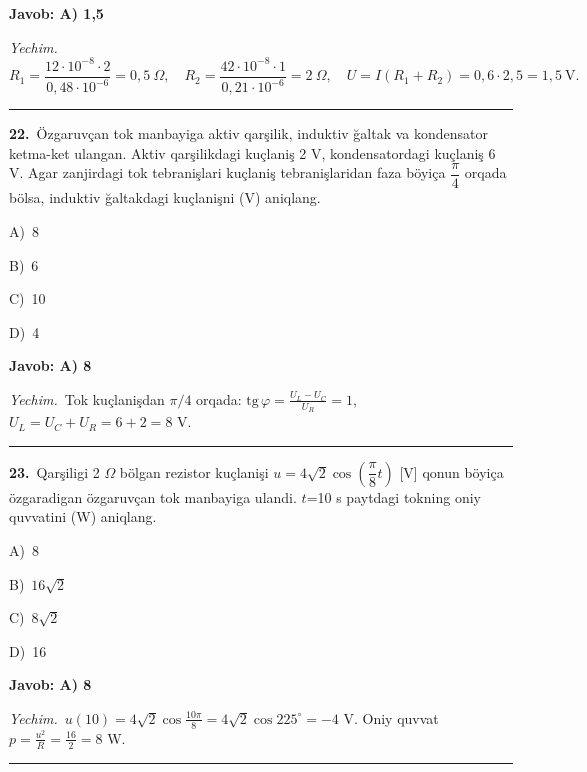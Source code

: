 \documentclass[11pt,a4paper]{article}
\newcommand{\opt}[2]{\hspace*{4mm}#1)\ #2\par}
\begin{document}
\noindent\colorbox{gray!12}{\parbox{\dimexpr\linewidth-2\fboxsep}{\textbf{Javob: A) 1,5}}}\par\smallskip
\noindent\textit{Yechim.}\ \[R_1=\frac{12\cdot10^{-8}\cdot2}{0{,}48\cdot10^{-6}}=0{,}5\ \Omega,\quad R_2=\frac{42\cdot10^{-8}\cdot1}{0{,}21\cdot10^{-6}}=2\ \Omega,\quad U=I(R_1+R_2)=0{,}6\cdot2{,}5=1{,}5\ \text{V}.\]\par\medskip\hrule\medskip
{}\noindent\begin{minipage}{\linewidth}
\textbf{22.}\ Özgaruvçan tok manbayiga aktiv qarşilik, induktiv ğaltak va kondensator ketma-ket ulangan. Aktiv qarşilikdagi kuçlaniş 2 V, kondensatordagi kuçlaniş 6 V. Agar zanjirdagi tok tebranişlari kuçlaniş tebranişlaridan faza böyiça $\dfrac{\pi}{4}$ orqada bölsa, induktiv ğaltakdagi kuçlanişni (V) aniqlang.\par\smallskip
\opt{A}{8}
\opt{B}{6}
\opt{C}{10}
\opt{D}{4}
\end{minipage}\vspace{2pt}\par
\noindent\colorbox{gray!12}{\parbox{\dimexpr\linewidth-2\fboxsep}{\textbf{Javob: A) 8}}}\par\smallskip
\noindent\textit{Yechim.}\ Tok kuçlanişdan $\pi/4$ orqada: $\mathrm{tg}\,\varphi=\frac{U_L-U_C}{U_R}=1$, $U_L=U_C+U_R=6+2=8$ V.\par\par\medskip\hrule\medskip
{}\noindent\begin{minipage}{\linewidth}
\textbf{23.}\ Qarşiligi 2 $\Omega$ bölgan rezistor kuçlanişi $u = 4\sqrt{2}\cos(\dfrac{\pi}{8}t)$ [V] qonun böyiça özgaradigan özgaruvçan tok manbayiga ulandi. $t$=10 s paytdagi tokning oniy quvvatini (W) aniqlang.\par\smallskip
\opt{A}{8}
\opt{B}{$16\sqrt{2}$}
\opt{C}{$8\sqrt{2}$}
\opt{D}{16}
\end{minipage}\vspace{2pt}\par
\noindent\colorbox{gray!12}{\parbox{\dimexpr\linewidth-2\fboxsep}{\textbf{Javob: A) 8}}}\par\smallskip
\noindent\textit{Yechim.}\ $u(10)=4\sqrt2\cos\frac{10\pi}{8}=4\sqrt2\cos225^\circ=-4$ V. Oniy quvvat $p=\frac{u^2}{R}=\frac{16}{2}=8$ W.\par\par\medskip\hrule\medskip
\end{document}
